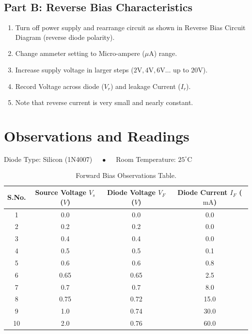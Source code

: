 \subsection{Part B: Reverse Bias Characteristics}
\begin{enumerate}
    \item Turn off power supply and rearrange circuit as shown in Reverse Bias Circuit Diagram (reverse diode polarity).
    \item Change ammeter setting to Micro-ampere ($\mu\text{A}$) range.
    \item Increase supply voltage in larger steps ($2\text{V}, 4\text{V}, 6\text{V} \dots$ up to $20\text{V}$).
    \item Record Voltage across diode ($V_r$) and leakage Current ($I_r$).
    \item Note that reverse current is very small and nearly constant.
\end{enumerate}

\section{Observations and Readings}

\noindent Diode Type: Silicon (1N4007) $\quad \bullet \quad$ Room Temperature: $25^\circ\text{C}$

\begin{table}[htbp]
\centering
\small
\begin{tabularx}{0.85\textwidth}{c c c c}
\toprule
\textbf{S.No.} & \textbf{Source Voltage $V_s$ ($V$)} & \textbf{Diode Voltage $V_F$ ($V$)} & \textbf{Diode Current $I_F$ ($\text{mA}$)} \\
\midrule
1 & 0.0 & 0.0 & 0.0 \\
2 & 0.2 & 0.2 & 0.0 \\
3 & 0.4 & 0.4 & 0.0 \\
4 & 0.5 & 0.5 & 0.1 \\
5 & 0.6 & 0.6 & 0.8 \\
6 & 0.65 & 0.65 & 2.5 \\
7 & 0.7 & 0.7 & 8.0 \\
8 & 0.75 & 0.72 & 15.0 \\
9 & 1.0 & 0.74 & 30.0 \\
10 & 2.0 & 0.76 & 60.0 \\
\bottomrule
\end{tabularx}
\caption{Forward Bias Observations Table.}
\label{tab:fb-readings}
\end{table}

